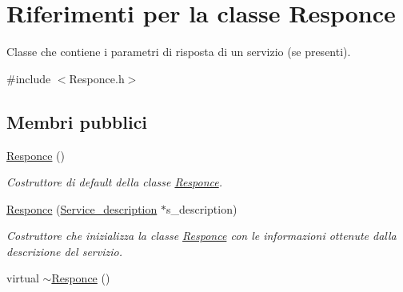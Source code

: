 \hypertarget{class_responce}{\section{Riferimenti per la classe Responce}
\label{class_responce}
}


Classe che contiene i parametri di risposta di un servizio (se presenti).  




{\ttfamily \#include $<$Responce.\-h$>$}

\subsection*{Membri pubblici}
\begin{DoxyCompactItemize}
\item 
\hypertarget{class_responce_aede5b4767eab4d3902b1986165bbc21a}{\hyperlink{class_responce_aede5b4767eab4d3902b1986165bbc21a}{Responce} ()}\label{class_responce_aede5b4767eab4d3902b1986165bbc21a}

\begin{DoxyCompactList}\small\item\em Costruttore di default della classe {\ttfamily \hyperlink{class_responce}{Responce}}. \end{DoxyCompactList}\item 
\hyperlink{class_responce_ad9b379c74a0a348bba1de5f57ea5bec4}{Responce} (\hyperlink{struct_service__description}{Service\-\_\-description} $\ast$s\-\_\-description)
\begin{DoxyCompactList}\small\item\em Costruttore che inizializza la classe {\ttfamily \hyperlink{class_responce}{Responce}} con le informazioni ottenute dalla descrizione del servizio. \end{DoxyCompactList}\item 
\hypertarget{class_responce_a1397a92089fe6cd640ff85f4c3f02e71}{virtual \hyperlink{class_responce_a1397a92089fe6cd640ff85f4c3f02e71}{$\sim$\-Responce} ()}\label{class_responce_a1397a92089fe6cd640ff85f4c3f02e71}


\end{DoxyCompactItemize}
